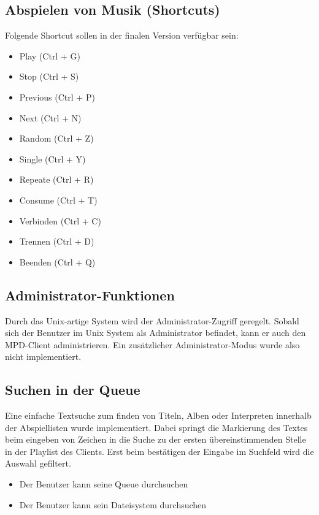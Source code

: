\subsection{Abspielen von Musik (Shortcuts)}
Folgende Shortcut sollen in der finalen Version verfügbar sein:
\begin{itemize}
	\item Play 	(Ctrl + G)
        \item Stop 	(Ctrl + S)
        \item Previous 	(Ctrl + P)
        \item Next	(Ctrl + N)
	\item Random	(Ctrl + Z)
	\item Single	(Ctrl + Y)
	\item Repeate	(Ctrl + R)
	\item Consume	(Ctrl + T)
        \item Verbinden	(Ctrl + C)
	\item Trennen	(Ctrl + D)
	\item Beenden	(Ctrl + Q)
\end{itemize}


\subsection{Administrator-Funktionen}
Durch das Unix-artige System wird der Administrator-Zugriff geregelt. Sobald sich der Benutzer im Unix System
als Administrator befindet, kann er auch den MPD-Client administrieren. Ein zusätzlicher Administrator-Modus wurde also
nicht implementiert.

\subsection{Suchen in der Queue}
Eine einfache Textsuche zum finden von Titeln, Alben oder Interpreten innerhalb der 
Abspiellisten wurde implementiert. Dabei springt die Markierung des Textes beim 
eingeben von Zeichen in die Suche zu der ersten übereinstimmenden Stelle in der 
Playlist des Clients. Erst beim bestätigen der Eingabe im Suchfeld wird die Auswahl 
gefiltert.
\begin{itemize}
	\item Der Benutzer kann seine Queue durchsuchen
	\item Der Benutzer kann sein Dateisystem durchsuchen
\end{itemize}
